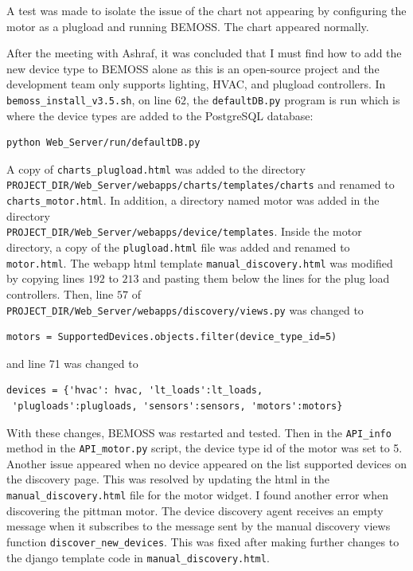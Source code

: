 \documentclass[fontsize=11pt, %
                             paper=letter, %
                             twoside, %
                             captions=tableheading,
                             index=totoc,
                             hyperref]{labbook}
\begin{document}
\begin{addmargin}[0cm]{0cm}
\bigbreak\noindent
A test was made to isolate the issue of the chart not appearing by configuring the motor as a plugload and running BEMOSS. The chart appeared normally. 

After the meeting with Ashraf, it was concluded that I must find how to add the new device type to BEMOSS alone as this is an open-source project and the development team only supports lighting, HVAC, and plugload controllers. In \texttt{bemoss\_install\_v3.5.sh}, on line $62$, the \texttt{defaultDB.py} program is run which is where the device types are added to the PostgreSQL database:
\begin{verbatim}
python Web_Server/run/defaultDB.py
\end{verbatim}
A copy of \texttt{charts\_plugload.html} was added to the directory\\ 
\texttt{PROJECT\_DIR/Web\_Server/webapps/charts/templates/charts} and renamed to \texttt{charts\_motor.html}. In addition, a directory named motor was added in the directory\\
 \texttt{PROJECT\_DIR/Web\_Server/webapps/device/templates}. Inside the motor directory, a copy of the \texttt{plugload.html} file was added and renamed to \texttt{motor.html}. The webapp html template \texttt{manual\_discovery.html} was modified by copying lines $192$ to $213$ and pasting them below the lines for the plug load controllers. Then, line $57$ of\\
\texttt{PROJECT\_DIR/Web\_Server/webapps/discovery/views.py} was changed to 
\begin{verbatim}
motors = SupportedDevices.objects.filter(device_type_id=5)
\end{verbatim}
and line 71 was changed to 
\begin{verbatim}
devices = {'hvac': hvac, 'lt_loads':lt_loads,
 'plugloads':plugloads, 'sensors':sensors, 'motors':motors}
\end{verbatim}
With these changes, BEMOSS was restarted and tested. Then in the \texttt{API\_info} method in the \texttt{API\_motor.py} script, the device type id of the motor was set to 5.
\bigbreak\noindent
Another issue appeared when no device appeared on the list supported devices on the discovery page. This was resolved by updating the html in the \texttt{manual\_discovery.html} file for the motor widget.
\bigbreak\noindent
I found another error when discovering the pittman motor. The device discovery agent receives an empty message when it subscribes to the message sent by the manual discovery views function \texttt{discover\_new\_devices}. This was fixed after making further changes to the django template code in \texttt{manual\_discovery.html}.

\end{addmargin}
\end{document}
